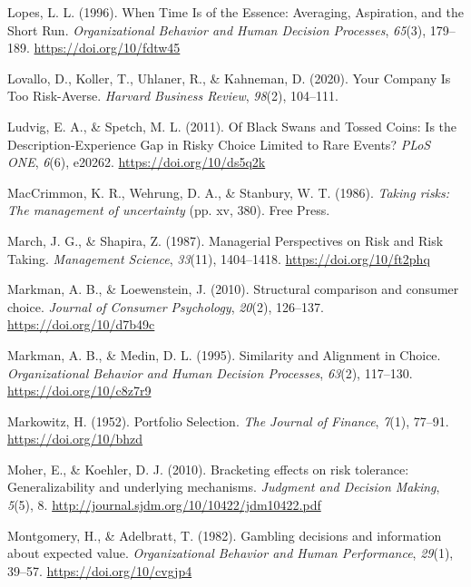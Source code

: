\documentclass[
  english,
  man, donotrepeattitle,floatsintext]{apa7}
\newlength{\cslhangindent}
\newenvironment{cslreferences}%
  {\setlength{\parindent}{0pt}%
  \everypar{\setlength{\hangindent}{\cslhangindent}}\ignorespaces}%
  {\par}
\theoremstyle{definition}
\theoremstyle{definition}
\theoremstyle{definition}
\theoremstyle{definition}
\theoremstyle{remark}
\begin{document}
\begin{cslreferences}
\leavevmode\hypertarget{ref-lopes1996}{}%
Lopes, L. L. (1996). When Time Is of the Essence: Averaging, Aspiration, and the Short Run. \emph{Organizational Behavior and Human Decision Processes}, \emph{65}(3), 179--189. \url{https://doi.org/10/fdtw45}

\leavevmode\hypertarget{ref-lovallo2020}{}%
Lovallo, D., Koller, T., Uhlaner, R., \& Kahneman, D. (2020). Your Company Is Too Risk-Averse. \emph{Harvard Business Review}, \emph{98}(2), 104--111.

\leavevmode\hypertarget{ref-ludvig2011}{}%
Ludvig, E. A., \& Spetch, M. L. (2011). Of Black Swans and Tossed Coins: Is the Description-Experience Gap in Risky Choice Limited to Rare Events? \emph{PLoS ONE}, \emph{6}(6), e20262. \url{https://doi.org/10/ds5q2k}

\leavevmode\hypertarget{ref-maccrimmon1986}{}%
MacCrimmon, K. R., Wehrung, D. A., \& Stanbury, W. T. (1986). \emph{Taking risks: The management of uncertainty} (pp. xv, 380). Free Press.

\leavevmode\hypertarget{ref-march1987}{}%
March, J. G., \& Shapira, Z. (1987). Managerial Perspectives on Risk and Risk Taking. \emph{Management Science}, \emph{33}(11), 1404--1418. \url{https://doi.org/10/ft2phq}

\leavevmode\hypertarget{ref-markman2010}{}%
Markman, A. B., \& Loewenstein, J. (2010). Structural comparison and consumer choice. \emph{Journal of Consumer Psychology}, \emph{20}(2), 126--137. \url{https://doi.org/10/d7b49c}

\leavevmode\hypertarget{ref-markman1995}{}%
Markman, A. B., \& Medin, D. L. (1995). Similarity and Alignment in Choice. \emph{Organizational Behavior and Human Decision Processes}, \emph{63}(2), 117--130. \url{https://doi.org/10/c8z7r9}

\leavevmode\hypertarget{ref-markowitz1952}{}%
Markowitz, H. (1952). Portfolio Selection. \emph{The Journal of Finance}, \emph{7}(1), 77--91. \url{https://doi.org/10/bhzd}

\leavevmode\hypertarget{ref-moher2010}{}%
Moher, E., \& Koehler, D. J. (2010). Bracketing effects on risk tolerance: Generalizability and underlying mechanisms. \emph{Judgment and Decision Making}, \emph{5}(5), 8. \url{http://journal.sjdm.org/10/10422/jdm10422.pdf}

\leavevmode\hypertarget{ref-montgomery1982}{}%
Montgomery, H., \& Adelbratt, T. (1982). Gambling decisions and information about expected value. \emph{Organizational Behavior and Human Performance}, \emph{29}(1), 39--57. \url{https://doi.org/10/cvgjp4}


\end{cslreferences}
\end{document}
